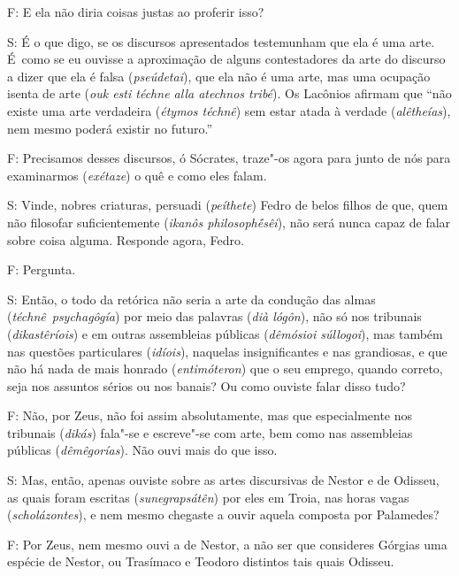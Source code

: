 \bekker{[260e]} F: E ela não diria coisas justas ao proferir isso?

S: É o que digo, se os discursos apresentados testemunham que ela é uma
arte. É~como se eu ouvisse a aproximação de alguns contestadores da arte
do discurso a dizer que ela é falsa (\emph{pseúdetai}), que ela não é
uma arte, mas uma ocupação isenta de arte (\emph{ouk esti téchne alla
atechnos tribé}). Os Lacônios afirmam que ``não existe uma arte
verdadeira (\emph{étymos téchnê}) sem estar atada à verdade
(\emph{alêtheías}), nem mesmo poderá existir no futuro.''

\bekker{[261a]} F: Precisamos desses discursos, ó Sócrates, traze"-os agora para
junto de nós para examinarmos (\emph{exétaze}) o quê e como eles falam.

S: Vinde, nobres criaturas, persuadi (\emph{peíthete}) Fedro de belos
filhos de que, quem não filosofar suficientemente (\emph{ikanôs
philosophḗsêi}), não será nunca capaz de falar sobre coisa alguma.
Responde agora, Fedro.

F: Pergunta.

S: Então, o todo da retórica não seria a arte da condução das almas
(\emph{téchnê}~\emph{psychagôgía}) por meio das palavras (\emph{dià
lógôn}), não só nos tribunais (\emph{dikastêríois}) e em outras
assembleias públicas (\emph{dêmósioi súllogoi}), mas também nas questões
particulares (\emph{idíois}), naquelas insignificantes e nas grandiosas,
e que não há nada de mais honrado (\emph{entimóteron}) que o seu
emprego, quando correto, seja nos assuntos sérios ou nos banais?
\bekker{[261b]} Ou como ouviste falar disso tudo?

F: Não, por Zeus, não foi assim absolutamente, mas que especialmente nos
tribunais (\emph{dikás}) fala"-se e escreve"-se com arte, bem como nas
assembleias públicas (\emph{dêmêgorías}). Não ouvi mais do que isso.

S: Mas, então, apenas ouviste sobre as artes discursivas de Nestor e de
Odisseu, as quais foram escritas (\emph{sunegrapsátên}) por eles em
Troia, nas horas vagas (\emph{scholázontes}), e nem mesmo chegaste a
ouvir aquela composta por Palamedes?

\bekker{[261c]} F: Por Zeus, nem mesmo ouvi a de Nestor, a não ser que
consideres Górgias uma espécie de Nestor, ou Trasímaco e Teodoro
distintos tais quais Odisseu.


